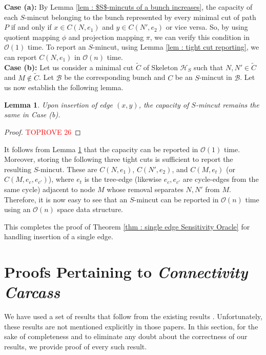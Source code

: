 \documentclass[letterpaper,11pt]{article}
\newtheorem{lemma}{Lemma}[]
\begin{document}
\noindent
\textbf{Case (a):} By Lemma \ref{lem : $S$-mincuts of a bunch increases}, the capacity of each $S$-mincut belonging to the bunch represented by every minimal cut of path $P$ if and only if $x\in C(N,e_1)$ and $y\in C(N',e_2)$ or vice versa. So, by using quotient mapping $\phi$ and projection mapping $\pi$, we can verify this condition in ${\mathcal O}(1)$ time. To report an $S$-mincut, using Lemma \ref{lem : tight cut reporting}, we can report $C(N,e_1)$ in ${\mathcal O}(n)$ time.  \\

\noindent
\textbf{Case (b):} Let us consider a minimal cut $\tilde C$ of Skeleton ${\mathcal H}_S$ such that $N,N'\in \tilde C$ and $M\notin \tilde C$. Let ${\mathcal B}$ be the corresponding bunch and $C$ be an $S$-mincut in ${\mathcal B}$. Let us now establish the following lemma.
\begin{lemma} \label{lem : insertion of an edge}
    Upon insertion of edge $(x,y)$, the capacity of $S$-mincut remains the same in Case (b). 
\end{lemma}
\begin{proof}\textcolor{red}{TOPROVE 26}\end{proof}
It follows from Lemma \ref{lem : insertion of an edge} that the capacity can be reported in ${\mathcal O}(1)$ time. Moreover, storing the following three tight cuts is sufficient to report the resulting $S$-mincut. These are $C(N,e_1)$, $C(N',e_2)$, and $C(M,e_t)$ (or $C(M,e_c,e_{c'})$), where $e_t$ is the tree-edge (likewise $e_c,e_{c'}$ are cycle-edges from the same cycle) adjacent to node $M$ whose removal separates $N,N'$ from $M$. Therefore, it is now easy to see that an $S$-mincut can be reported in ${\mathcal O}(n)$ time using an ${\mathcal O}(n)$ space data structure.

This completes the proof of Theorem \ref{thm : single edge Sensitivity Oracle} for handling insertion of a single edge.


\section{Proofs Pertaining to \textit{Connectivity Carcass}}
We have used a set of results that follow from the existing results \cite{DBLP:conf/soda/BaswanaP22, DBLP:conf/stoc/DinitzV94, DBLP:conf/soda/DinitzV95, DBLP:journals/siamcomp/DinitzV00}. Unfortunately, these results are not mentioned explicitly in those papers. In this section, for the sake of completeness and to eliminate any doubt about the correctness of our results, we provide proof of every such result. 
\end{document}
